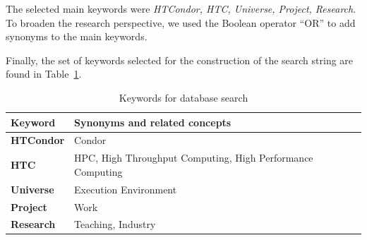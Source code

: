 The selected main keywords were \textit{HTCondor, HTC, Universe, Project, Research}. To broaden the research perspective, we used the Boolean operator ``OR'' to add synonyms to the main keywords.

Finally, the set of keywords selected for the construction of the search string are found in Table~\ref{table:database_search_keywords}.


\begin{table}[htbp]
	\centering
	\caption{Keywords for database search}
	\label{table:database_search_keywords}
	\renewcommand{\arraystretch}{1}  %
	\begin{tabular}{p{1.4cm}p{6.4cm}}
		\toprule
		\textbf{Keyword}  & \textbf{Synonyms and related concepts}                     \\
		\midrule
		\textbf{HTCondor} & Condor                                                     \\
		\addlinespace[0.8em]
		\textbf{HTC}      & HPC, High Throughput Computing, High Performance Computing \\
		\addlinespace[0.8em]
		\textbf{Universe} & Execution Environment                                      \\
		\addlinespace[0.8em]
		\textbf{Project}  & Work                                                       \\
		\addlinespace[0.8em]
		\textbf{Research} & Teaching, Industry                                         \\
		\bottomrule
	\end{tabular}
\end{table}





